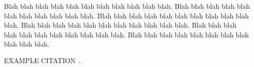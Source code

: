 
\label{sec-introduction}


%
Blah blah blah blah blah blah blah blah blah blah blah.
%
Blah blah blah blah blah blah blah blah blah blah blah.
%
Blah blah blah blah blah blah blah blah blah blah blah.
%
Blah blah blah blah blah blah blah blah blah blah blah.
%
Blah blah blah blah blah blah blah blah blah blah blah.
%
Blah blah blah blah blah blah blah blah blah blah blah.


EXAMPLE CITATION~\cite{Fleming2013TOSEM}.

